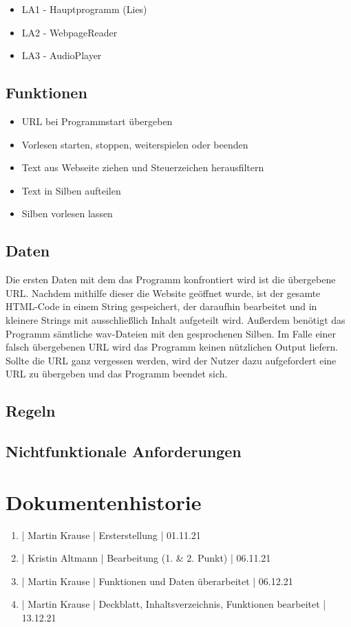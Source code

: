 \documentclass[12pt]{scrartcl}
\begin{document}
\begin{itemize}
	\item LA1 - Hauptprogramm (Lies)
	\item LA2 - WebpageReader
	\item LA3 - AudioPlayer
\end{itemize}

\subsection{Funktionen}

\begin{itemize}
	\item URL bei Programmstart übergeben
	\item Vorlesen starten, stoppen, weiterspielen oder beenden
	\item Text aus Webseite ziehen und Steuerzeichen herausfiltern
	\item Text in Silben aufteilen
	\item Silben vorlesen lassen
\end{itemize}

\subsection{Daten}

Die ersten Daten mit dem das Programm konfrontiert wird ist die übergebene URL. Nachdem mithilfe dieser
die Website geöffnet wurde, ist der gesamte HTML-Code in einem String gespeichert, der daraufhin bearbeitet
und in kleinere Strings mit ausschließlich Inhalt aufgeteilt wird. Außerdem benötigt das Programm sämtliche
wav-Dateien mit den gesprochenen Silben. Im Falle einer falsch übergebenen URL wird das Programm keinen nützlichen Output liefern. Sollte die URL ganz vergessen werden, wird der Nutzer dazu aufgefordert eine URL zu übergeben und das Programm beendet sich.

\subsection{Regeln}


\subsection{Nichtfunktionale Anforderungen}


\section{Dokumentenhistorie}

\begin{enumerate}
	\item | Martin Krause | Ersterstellung | 01.11.21
	\item | Kristin Altmann | Bearbeitung (1. \& 2. Punkt) | 06.11.21
	\item | Martin Krause | Funktionen und Daten überarbeitet | 06.12.21
	\item | Martin Krause | Deckblatt, Inhaltsverzeichnis, Funktionen bearbeitet | 13.12.21
\end{enumerate}
 
\end{document}
